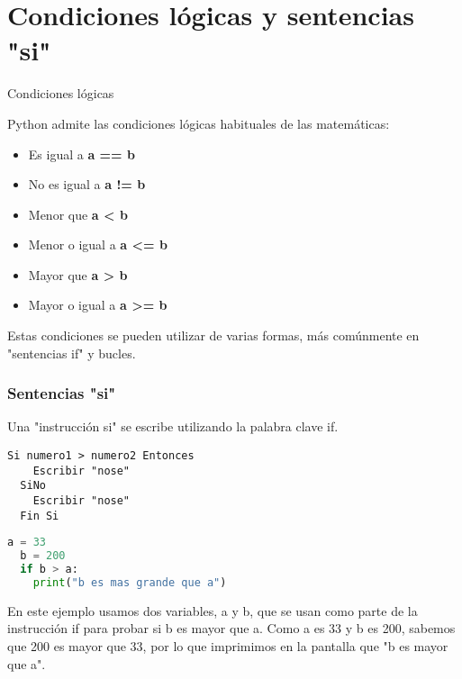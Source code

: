 
\section{Condiciones lógicas y sentencias "si"}

\begin{frame}[c]{Condiciones lógicas}

  Python admite las condiciones lógicas habituales de las matemáticas:

  \vspace{\baselineskip}
  \begin{itemize}
    \item Es igual a \textbf{a == b}
    \pausa
    \item No es igual a \textbf{a != b}
    \pausa
    \item Menor que \textbf{a < b}
    \pausa
    \item Menor o igual a \textbf{a <= b}
    \pausa
    \item Mayor que \textbf{a > b}
    \pausa
    \item Mayor o igual a \textbf{a >= b}
  \end{itemize}

  \vspace{\baselineskip}
  Estas condiciones se pueden utilizar de varias formas, más
  comúnmente en "sentencias \textcolor{codeKeyword}{if}" y bucles.
\end{frame}

\begin{frame}[fragile]
  \frametitle{Sentencias "si"}

  Una "instrucción si" se escribe utilizando la palabra clave
  \textcolor{codeKeyword}{if}.

  \vspace{\baselineskip}
  \begin{lstlisting}[language=PSeInt]
  Si numero1 > numero2 Entonces
    Escribir "nose"
  SiNo
    Escribir "nose"
  Fin Si
  \end{lstlisting}

  \vspace{\baselineskip}
  \begin{lstlisting}[language=Python]
  a = 33
  b = 200
  if b > a:
    print("b es mas grande que a")
  \end{lstlisting}

  En este ejemplo usamos dos variables, a y b, que se usan como parte de
  la instrucción \textcolor{codeKeyword}{if} para probar si b es mayor
  que a. Como a es 33 y b es 200, sabemos que 200 es mayor que 33,
  por lo que imprimimos en la pantalla que "b es mayor que a".
\end{frame}

